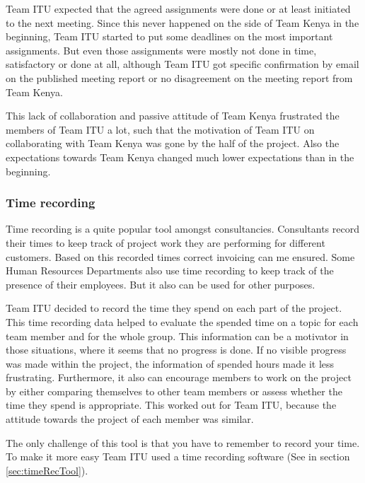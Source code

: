 Team ITU expected that the agreed assignments were done or at least initiated to the next meeting. Since this never happened on the side of Team Kenya in the beginning, Team ITU started to put some deadlines on the most important assignments. But even those assignments were mostly not done in time, satisfactory or done at all, although Team ITU got specific confirmation by email on the published meeting report or no disagreement on the meeting report from Team Kenya.

This lack of collaboration and passive attitude of Team Kenya frustrated the members of Team ITU a lot, such that the motivation of Team ITU on collaborating with Team Kenya was gone by the half of the project. Also the expectations towards Team Kenya changed much lower expectations than in the beginning.

\subsubsection {Time recording}
Time recording is a quite popular tool amongst consultancies. Consultants record their times to keep track of project work they are performing for different customers. Based on this recorded times correct invoicing can me ensured. Some Human Resources Departments also use time recording to keep track of the presence of their employees. But it also can be used for other purposes.

Team ITU decided to record the time they spend on each part of the project. This time recording data helped to evaluate the spended time on a topic for each team member and for the whole group. This information can be a motivator in those situations, where it seems that no progress is done. If no visible progress was made within the project, the information of spended hours made it less frustrating. Furthermore, it also can encourage members to work on the project by either comparing themselves to other team members or assess whether the time they spend is appropriate. This worked out for Team ITU, because the attitude towards the project of each member was similar.

The only challenge of this tool is that you have to remember to record your time. To make it more easy Team ITU used a time recording software (See in section \ref{sec:timeRecTool}).

